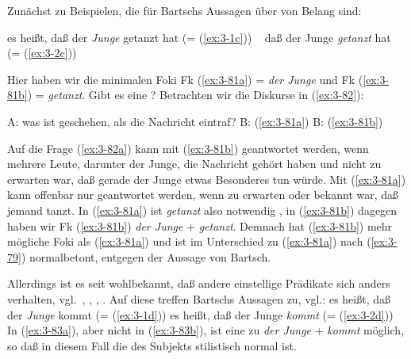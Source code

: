 \documentclass[output=paper]{langsci/langscibook}
\begin{document}
Zunächst zu Beispielen, die für Bartschs Aussagen über
 von Belang sind:
\begin{exe}
\ex
\label{ex:3-81}
\begin{xlist}
\ex
\label{ex:3-81a}
es heißt, daß der \textit{Junge} getanzt hat (= (\ref{ex:3-1c}))
\ex
\label{ex:3-81b}
~\hphantom{es heißt} daß der Junge \textit{getanzt} hat (= (\ref{ex:3-2c}))
\end{xlist}
\end{exe}
Hier haben wir die minimalen Foki Fk (\ref{ex:3-81a}) = \textit{der Junge}
und Fk (\ref{ex:3-81b}) = \textit{getanzt}. Gibt es eine ?
Betrachten wir die Diskurse in (\ref{ex:3-82}):
\begin{exe}
\ex
\label{ex:3-82}
\begin{xlist}
\ex
\label{ex:3-82a}
A: was ist geschehen, als die Nachricht eintraf?
\ex
\label{ex:3-82b}
B: (\ref{ex:3-81a})
\ex
\label{ex:3-82c}
B: (\ref{ex:3-81b})
\end{xlist}
\end{exe}
Auf die Frage (\ref{ex:3-82a}) kann mit (\ref{ex:3-81b}) geantwortet werden, wenn mehrere Leute,
darunter der Junge, die Nachricht gehört haben und nicht zu erwarten
war, daß gerade der Junge etwas Besonderes tun würde. Mit (\ref{ex:3-81a}) kann
offenbar nur geantwortet werden, wenn zu erwarten oder bekannt war,
daß jemand tanzt. In (\ref{ex:3-81a}) ist \textit{getanzt} also notwendig ,
in (\ref{ex:3-81b}) dagegen haben wir Fk (\ref{ex:3-81b}) \textit{der Junge} +
\textit{getanzt}. Demnach hat (\ref{ex:3-81b}) mehr mögliche Foki als (\ref{ex:3-81a}) und
ist im Unterschied zu (\ref{ex:3-81a}) nach (\ref{ex:3-79}) normalbetont, entgegen der
Aussage von Bartsch.

Allerdings ist es seit \citet{Hatcher56b, Hatcher56a} wohlbekannt, daß
andere einstellige Prädikate sich anders verhalten,
vgl.\ \zb \citet[81 Fn.\,8]{Heidolph70}, \citet[41ff]{Schmerling76},
\citet{Fuchs76}, \citet{AllCrutt79}. Auf diese treffen Bartschs Aussagen
zu, vgl.:
\eal
\label{ex:3-83}
\ex
\label{ex:3-83a}
es heißt, daß der \textit{Junge} kommt (= (\ref{ex:3-1d}))
\ex
\label{ex:3-83b}
es heißt, daß der Junge \textit{kommt} (= (\ref{ex:3-2d}))
\zl
In (\ref{ex:3-83a}), aber nicht in (\ref{ex:3-83b}), ist eine  zu \textit{der Junge} +
\textit{kommt} möglich, so daß in diesem Fall die  des Subjekts
stilistisch normal ist.
\end{document}
